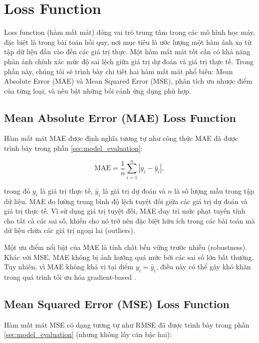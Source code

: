 \section{Loss Function}

Loss function (hàm mất mát) đóng vai trò trung tâm trong các mô hình học máy, đặc biệt là trong bài toán hồi quy, nơi mục tiêu là ước lượng một hàm ánh xạ từ tập dữ liệu đầu vào đến các giá trị thực. Một hàm mất mát tốt cần có khả năng phản ánh chính xác mức độ sai lệch giữa giá trị dự đoán và giá trị thực tế. Trong phần này, chúng tôi sẽ trình bày chi tiết hai hàm mất mát phổ biến: Mean Absolute Error (MAE) và Mean Squared Error (MSE), phân tích ưu nhược điểm của từng loại, và nêu bật những bối cảnh ứng dụng phù hợp.

\subsection{Mean Absolute Error (MAE) Loss Function}

Hàm mất mát MAE được định nghĩa tương tự như công thức MAE đã được trình bày trong phần \ref{sec:model_evaluation}:

\begin{equation}
\text{MAE} = \frac{1}{n} \sum_{i=1}^{n} \left| y_i - \hat{y}_i \right|,
\label{mae}
\end{equation}

trong đó $y_i$ là giá trị thực tế, $\hat{y}_i$ là giá trị dự đoán và $n$ là số lượng mẫu trong tập dữ liệu. MAE đo lường trung bình độ lệch tuyệt đối giữa các giá trị dự đoán và giá trị thực tế. Vì sử dụng giá trị tuyệt đối, MAE duy trì mức phạt tuyến tính cho tất cả các sai số, khiến cho nó trở nên đặc biệt hữu ích trong các bài toán mà dữ liệu chứa các giá trị ngoại lai (outliers).

Một ưu điểm nổi bật của MAE là tính chất bền vững trước nhiễu (robustness). Khác với MSE, MAE không bị ảnh hưởng quá mức bởi các sai số lớn bất thường. Tuy nhiên, vì MAE không khả vi tại điểm $y_i = \hat{y}_i$, điều này có thể gây khó khăn trong quá trình tối ưu hóa gradient-based \cite{willmott2005advantages}.

\subsection{Mean Squared Error (MSE) Loss Function}

Hàm mất mát MSE có dạng tương tự như RMSE đã được trình bày trong phần \ref{sec:model_evaluation} (nhưng không lấy căn bậc hai):

